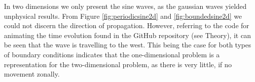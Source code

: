 In two dimensions we only present the sine waves, as the gaussian waves yielded unphysical results. From Figure \ref{fig:periodicsine2d} and \ref{fig:boundedsine2d} we could not discern the direction of propagation. However, referring to the code for animating the time evolution found in the GitHub repository (see Theory), it can be seen that the wave is travelling to the west. This being the case for both types of boundary conditions indicates that the one-dimensional problem is a representation for the two-dimensional problem, as there is very little, if no movement zonally.

